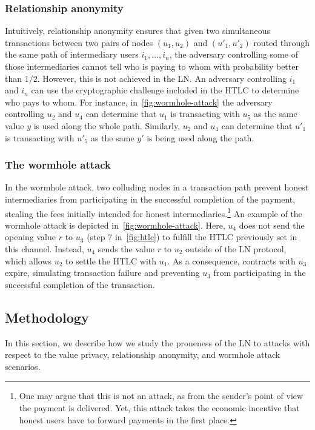 \subsubsection{Relationship anonymity~\cite{Malavolta2017}}
Intuitively, relationship anonymity ensures that given two simultaneous transactions 
between two pairs of nodes $(u_1, u_2)$ and $(u'_1, u'_2)$ routed through the same path of intermediary 
users $i_1, \ldots, i_n$, the adversary controlling some of those intermediaries cannot tell who is paying to whom with probability better than $1/2$.
However, this is not achieved in the LN.
An adversary controlling $i_1$ and $i_n$ can use the cryptographic challenge included in the HTLC to 
determine who pays to whom.
For instance, in~\cref{fig:wormhole-attack} the adversary controlling $u_2$ 
and $u_4$ can determine that $u_1$ is transacting with $u_5$ as the same value $y$ is used along the whole path. 
Similarly, $u_2$ and $u_4$ can determine that $u'_1$ is transacting with $u'_5$ as the same $y'$ is being used along the path. 

\subsubsection{The wormhole attack~\cite{Malavolta2019}}
In the wormhole attack, two colluding nodes in a transaction path prevent honest intermediaries from 
participating in the successful completion of the payment, stealing the 
fees initially intended for honest intermediaries.\footnote{One may argue that this is not an attack, as from the sender's point of view the payment is delivered. Yet, this attack takes the economic incentive that honest users have to forward payments in the first place.} 
An example of the wormhole attack is depicted in~\cref{fig:wormhole-attack}. 
Here, $u_4$ does not send the opening value $r$ to $u_3$ (step 7 in~\cref{fig:htlc}) to fulfill the HTLC previously set in this channel. 
Instead, $u_4$ sends the value $r$ to $u_2$ outside of the LN protocol, which allows $u_2$ to settle the HTLC with $u_1$. 
As a consequence, contracts with $u_3$ expire, simulating transaction failure and
preventing $u_3$ from participating in the successful completion of the transaction. 



\subsection{Methodology}
In this section, we describe how we study the proneness of the LN to attacks with respect to the value privacy, relationship anonymity, and wormhole attack scenarios. 

